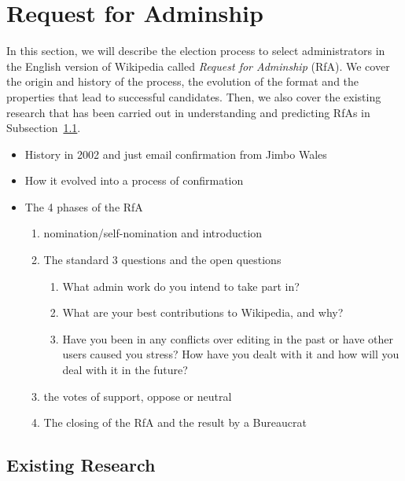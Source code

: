 \section{Request for Adminship}
In this section, we will describe the election process to select administrators in the English version of Wikipedia called \textit{Request for Adminship} (RfA). We cover the origin and history of the process, the evolution of the format and the properties that lead to successful candidates. Then, we also cover the existing research that has been carried out in understanding and predicting RfAs in Subsection~\ref{sec:existing-rfa-research}.

\begin{itemize}
    \item History in 2002 and just email confirmation from Jimbo Wales
    \item How it evolved into a process of confirmation
    \item The 4 phases of the RfA
    \begin{enumerate}
        \item nomination/self-nomination and introduction
        \item The standard 3 questions and the open questions
        \begin{enumerate}
            \item What admin work do you intend to take part in?
            \item What are your best contributions to Wikipedia, and why?
            \item Have you been in any conflicts over editing in the past or have other users caused you stress? How have you dealt with it and how will you deal with it in the future?
        \end{enumerate}
        \item the votes of support, oppose or neutral
        \item The closing of the RfA and the result by a Bureaucrat 
    \end{enumerate}
\end{itemize}

\subsection{Existing Research}
\label{sec:existing-rfa-research}